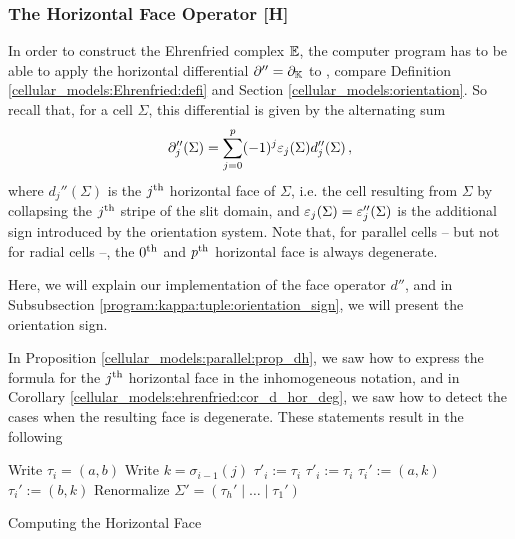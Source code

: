 \subsubsection{The Horizontal Face Operator [H]}
\label{program:kappa:tuple:d_hor}

In order to construct the Ehrenfried complex $\mathbb E$, 
the computer program has to be able to apply the horizontal differential $\partial'' = \partial_\mathbb K$ to , 
compare Definition \ref{cellular_models:Ehrenfried:defi} and Section \ref{cellular_models:orientation}.
So recall that, for a cell $\Sigma$, this differential is given by the alternating sum
\[
 \partial''_j(\Sigma) = \sum_{j = 0}^p (-1)^j \varepsilon_j(\Sigma) d_j''(\Sigma)\,,
\]
where $d_j''(\Sigma)$ is the $j^{\text{th}}$ horizontal face of $\Sigma$, 
i.e. the cell resulting from $\Sigma$ by collapsing the $j^{\text{th}}$ stripe of the slit domain,
and $\varepsilon_j(\Sigma) = \varepsilon_j''(\Sigma)$ is the additional sign introduced by the orientation system.
Note that, for parallel cells -- but not for radial cells --, the $0^{\text{th}}$ and $p^{\text{th}}$ horizontal face is always degenerate.

Here, we will explain our implementation of the face operator $d''$, 
and in Subsubsection \ref{program:kappa:tuple:orientation_sign}, we will present the orientation sign.

In Proposition \ref{cellular_models:parallel:prop_dh}, 
we saw how to express the formula for the $j^{\text{th}}$ horizontal face in the inhomogeneous notation,
and in Corollary \ref{cellular_models:ehrenfried:cor_d_hor_deg}, we saw how to detect the cases when the resulting face is degenerate.
These statements result in the following

\begin{algorithm}[H]
\label{d_hor}
\DontPrintSemicolon
{}

{
	Write $\tau_i = (a, b)$\;
	Write $k = \sigma_{i-1}(j)$\;
	{
	  $\tau'_i := \tau_i$\;
	}
	{
	  \;
	}
	\Else
	{
	  {
	    $\tau'_i := \tau_i$\;
	  }
	  \Else
	  {
	    {
	      $\tau_i' := (a, k)$\; 
	    }
	    \Else
	    {
	      $\tau_i' := (b, k)$\;
	    }
	  }
	}
}
Renormalize $\Sigma' = (\tau_h' \mid \ldots \mid \tau_1')$\;
\;

\caption{Computing the Horizontal Face}

\end{algorithm}

